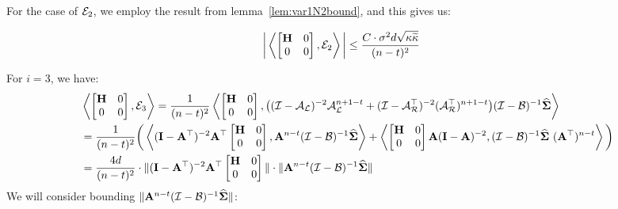 For the case of $\mathcal{E}_2$, we employ the result from lemma~\ref{lem:var1N2bound}, and this gives us:

\begin{align}
\label{eq:e2}
&\bigg\vert\iprod{\begin{bmatrix}\H&0\\0&0\end{bmatrix}}{\Y_2}\bigg\vert\leq\frac{\UC\cdot\sigma^2 d\sqrt{\cnH\cnS}}{(n-t)^2}%
\end{align}

For $i=3$, we have:
\begin{align}
\label{eq:e31}
&\iprod{\begin{bmatrix}\H&0\\0&0\end{bmatrix}}{\Y_3}=\frac{1}{(n-t)^2}\iprod{\begin{bmatrix}\H&0\\0&0\end{bmatrix}}{\big((\eyeT-\AL)^{-2}\AL^{n+1-t}+(\eyeT-\AR\T)^{-2}(\AR\T)^{n+1-t}\big)(\eyeT-\BT)^{-1}\Sigh}\nonumber\\
&=\frac{1}{(n-t)^2}\bigg(\iprod{(\eye-\A\T)^{-2}\A\T\begin{bmatrix}\H&0\\0&0\end{bmatrix}}{\A^{n-t}(\eyeT-\BT)^{-1}\Sigh}+\iprod{\begin{bmatrix}\H&0\\0&0\end{bmatrix}\A(\eye-\A)^{-2}}{(\eyeT-\BT)^{-1}\Sigh\ (\A\T)^{n-t}}\bigg)\nonumber\\
&=\frac{4d}{(n-t)^2}\cdot\|(\eye-\A\T)^{-2}\A\T\begin{bmatrix}\H&0\\0&0\end{bmatrix}\|\cdot\|\A^{n-t}(\eyeT-\BT)^{-1}\Sigh\|
\end{align}
We will consider bounding $\|\mathbf{A}^{n-t}(\mathcal{I}-\mathcal{B})^{-1}\mathbf{\widehat{\Sigma}}\|$:
